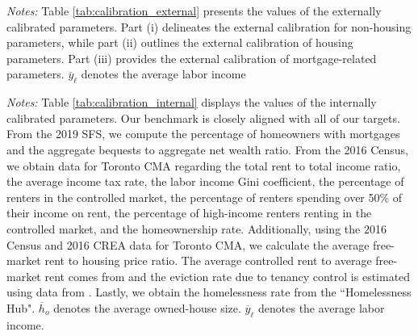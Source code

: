 \documentclass[parskip=full]{article}
\newenvironment{fignote2}[1]
{
\par
\medskip
\begin{minipage}{#1}
\footnotesize
}
{
\end{minipage}
}
\begin{document}
\vspace{1cm}

\begin{table}[H]
    \centering
    \caption{Externally assigned parameter values}
    \vspace{-0.5cm}
    \label{tab:calibration_external}
    
    \vspace{-0.45cm}
    \begin{fignote2}{1.02\textwidth}
    \textit{Notes:} Table \ref{tab:calibration_external} presents the values of the externally calibrated parameters. Part (i) delineates the external calibration for non-housing parameters, while part (ii) outlines the external calibration of housing parameters. Part (iii) provides the external calibration of mortgage-related parameters. $\overline{y}_{\ell}$ denotes the average labor income
    \end{fignote2}
\end{table}

\begin{table}[H]
    \centering
    \caption{Internally assigned parameter values}
    \vspace{-0.5cm}
    \label{tab:calibration_internal}
    
    \vspace{-0.45cm}
    \begin{fignote2}{0.98\textwidth}
    \textit{Notes:} Table \ref{tab:calibration_internal} displays the values of the internally calibrated parameters. Our benchmark is closely aligned with all of our targets. From the 2019 SFS, we compute the percentage of homeowners with mortgages and the aggregate bequests to aggregate net wealth ratio.  From the 2016 Census, we obtain data for Toronto CMA regarding the total rent to total income ratio, the average income tax rate, the labor income Gini coefficient, the percentage of renters in the controlled market, the percentage of renters spending over 50\% of their income on rent, the percentage of high-income renters renting in the controlled market, and the homeownership rate. Additionally, using the 2016 Census and 2016 CREA data for Toronto CMA, we calculate the average free-market rent to housing price ratio. The average controlled rent to average free-market rent comes from \citet{zhang-gou} and the eviction rate due to tenancy control is estimated using data from \citet{LeonIveniuk2020}. Lastly, we obtain the homelessness rate from the ``Homelessness Hub". $\overline{h}_{o}$ denotes the average owned-house size. $\overline{y}_{\ell}$ denotes the average labor income.
    \end{fignote2}
\end{table}
\end{document}
